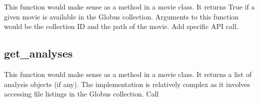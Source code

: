 This function would make sense as a method in a movie class. It returns True if a given movie 
is available in the Globus collection. Arguments to this function would be the collection ID 
and the path of the movie. Add specific API call.

\subsection{get\_analyses}

This function would make sense as a method in a movie class. It returns a list of analysis 
objects (if any). The implementation is relatively complex as it involves accessing file 
listings in the Globus collection. Call 